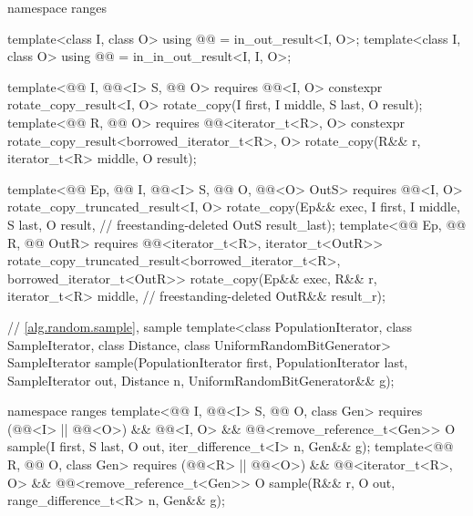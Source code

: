 \begin{codeblock}
{  namespace ranges {
    template<class I, class O>
      using @@ = in_out_result<I, O>;
    template<class I, class O>
      using @@ = in_in_out_result<I, I, O>;

    template<@@ I, @@<I> S, @@ O>
      requires @@<I, O>
      constexpr rotate_copy_result<I, O>
        rotate_copy(I first, I middle, S last, O result);
    template<@@ R, @@ O>
      requires @@<iterator_t<R>, O>
      constexpr rotate_copy_result<borrowed_iterator_t<R>, O>
        rotate_copy(R&& r, iterator_t<R> middle, O result);

    template<@@ Ep, @@ I, @@<I> S,
             @@ O, @@<O> OutS>
      requires @@<I, O>
      rotate_copy_truncated_result<I, O>
        rotate_copy(Ep&& exec, I first, I middle, S last, O result,     // freestanding-deleted
                    OutS result_last);
    template<@@ Ep, @@ R, @@ OutR>
      requires @@<iterator_t<R>, iterator_t<OutR>>
      rotate_copy_truncated_result<borrowed_iterator_t<R>, borrowed_iterator_t<OutR>>
        rotate_copy(Ep&& exec, R&& r, iterator_t<R> middle,             // freestanding-deleted
                    OutR&& result_r);
  }

  // \ref{alg.random.sample}, sample
  template<class PopulationIterator, class SampleIterator,
           class Distance, class UniformRandomBitGenerator>
    SampleIterator sample(PopulationIterator first, PopulationIterator last,
                          SampleIterator out, Distance n,
                          UniformRandomBitGenerator&& g);

  namespace ranges {
    template<@@ I, @@<I> S,
             @@ O, class Gen>
      requires (@@<I> || @@<O>) &&
               @@<I, O> &&
               @@<remove_reference_t<Gen>>
      O sample(I first, S last, O out, iter_difference_t<I> n, Gen&& g);
    template<@@ R, @@ O, class Gen>
      requires (@@<R> || @@<O>) &&
               @@<iterator_t<R>, O> &&
               @@<remove_reference_t<Gen>>
      O sample(R&& r, O out, range_difference_t<R> n, Gen&& g);
  }

}
\end{codeblock}
